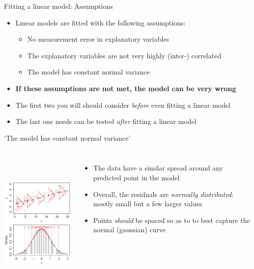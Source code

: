 \documentclass[xcolor=x11names,handout,compress]{beamer}
\renewcommand{\(}{\begin{columns}}
\renewcommand{\)}{\end{columns}}
\newcommand{\<}[1]{\begin{column}{#1}}
\renewcommand{\>}{\end{column}}
\begin{document}

\begin{frame}{Fitting a linear model: Assumptions}

\begin{itemize}\itemsep20pt
\item Linear models are fitted with the following assumptions:
\begin{itemize}
\item No measurement error in explanatory variables
\item The explanatory variables are not very highly (inter-) correlated
\item {} The model has constant normal variance
\end{itemize}
\item {\bf If these assumptions are not met, the model can be very wrong}
\item The first two you will should consider {\it before} even fitting a linear model
\item<2> The last one needs can be tested {\it after} fitting a linear model
\end{itemize}

\end{frame}


\begin{frame}{`The model has constant normal variance'}
\begin{columns}[T]

		\includegraphics[height=72mm]{ResidDemo.pdf}
		
		\begin{itemize}
		\item The data have a similar spread around any predicted point in the model
		\vspace{2cm}
		\item Overall, the residuals are {\it normally distributed}: mostly small but a few larger values
        \item Points {\it should} be spaced so as to to best capture the normal (gaussian) curve
		\end{itemize}
		
\end{columns}
\end{frame}
\end{document}

